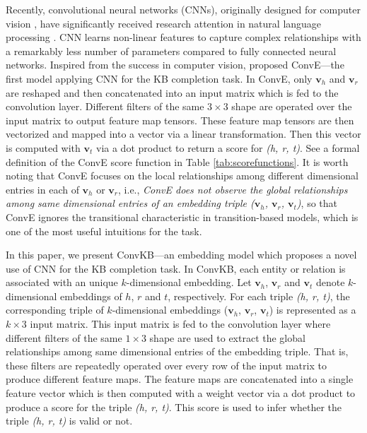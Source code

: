 \documentclass[11pt,a4paper]{article}
\begin{document}
Recently, convolutional neural networks (CNNs), originally designed for computer vision \citep{lecun1998gradient},  have significantly received research attention  in natural language processing \citep{collobert2011natural,kim2014convolutional}.
CNN learns non-linear features to capture complex relationships with a remarkably less number of parameters compared to fully connected neural networks.
Inspired from the success in computer vision, \citet{Dettmers2017} proposed ConvE---the first model applying CNN for the KB completion task.
In ConvE, only $\boldsymbol{v}_h$ and $\boldsymbol{v}_r$ are reshaped and then concatenated into an input matrix which is fed to the convolution layer.
Different filters  of the same $3\times3$ shape are operated over the input matrix to output feature map tensors. These feature map tensors are  then vectorized and mapped into a vector via a linear transformation.
Then this vector is computed with $\boldsymbol{v}_t$ via a dot product to return a score for \textit{(h, r, t)}. See  a formal definition of the ConvE score function in Table \ref{tab:scorefunctions}. 
It is worth noting  that ConvE  focuses on the local relationships among different dimensional entries in each of $\boldsymbol{v}_h$ or $\boldsymbol{v}_r$, i.e., \emph{ConvE does not observe the global relationships among same dimensional entries of an embedding triple ($\boldsymbol{v}_h$, $\boldsymbol{v}_r$, $\boldsymbol{v}_t$)}, so that ConvE ignores the transitional characteristic in  transition-based models, which is one of the most useful intuitions for the task.

In this paper, we present ConvKB---an embedding model which proposes a novel use of CNN for the KB completion task. In ConvKB, each entity or relation is associated with an unique $k$-dimensional embedding. Let $\boldsymbol{v}_h$, $\boldsymbol{v}_r$ and $\boldsymbol{v}_t$ denote  $k$-dimensional embeddings of $h$, $r$ and $t$, respectively. 
For each triple \textit{(h, r, t)}, the corresponding triple of $k$-dimensional  embeddings ($\boldsymbol{v}_h$, $\boldsymbol{v}_r$, $\boldsymbol{v}_t$) is represented as a $k\times3$  input matrix. 
This input matrix is fed to the convolution layer where different filters of the same $1\times3$ shape are used to extract the global relationships among same dimensional entries of the embedding triple.
That is, these filters are repeatedly operated over every row of the input matrix to produce different feature maps. The  feature maps are concatenated into a single feature vector which is then computed with a weight vector via a dot product to produce a score for the triple  \textit{(h, r, t)}. 
This score is used to infer whether the triple \textit{(h, r, t)} is valid or not.
\end{document}
